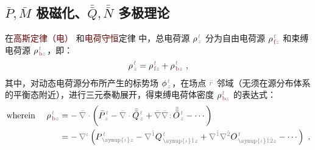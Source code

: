 \vspace*{-5.5em}

\subsection{$\bar{P},\bar{M}$ 极磁化、$\bar{\bar{Q}},\bar{\bar{N}}$ 多极理论}\label{ssec:PMQN}

在\textcolor{Maroon}{高斯定律（电）}  和\textcolor{Maroon}{电荷守恒}定律  中，总电荷源 ${\rho}^{\;\!\mathcolor{gray}{t}}_{\;\!\mathcolor{gray}{z}}$ 分为自由电荷源 ${\rho}^{\;\!\mathcolor{gray}{t}}_{\;\!\textcolor{Maroon}{\text{f}}\mathcolor{gray}{z}}$ 和束缚电荷源 ${\rho}^{\;\!\mathcolor{gray}{t}}_{\;\!\textcolor{Maroon}{\text{b}}\mathcolor{gray}{z}}$\cite{langeMultipoleTheoryHehl2015,raabMultipoleTheoryElectromagnetism2004}，即：
\abovedisplayskip=5pt
\belowdisplayskip=5pt
\begin{align} \label{eq:p=f+b}
	{\rho}^{\;\!\mathcolor{gray}{t}}_{\;\!\mathcolor{gray}{z}} = {\rho}^{\;\!\mathcolor{gray}{t}}_{\;\!\textcolor{Maroon}{\text{f}}\mathcolor{gray}{z}} + {\rho}^{\;\!\mathcolor{gray}{t}}_{\;\!\textcolor{Maroon}{\text{b}}\mathcolor{gray}{z}}~,
\end{align}
其中，对动态电荷源分布所产生的标势场 $\phi^{\;\!\mathcolor{gray}{t}}_{\;\!\mathcolor{gray}{z}}$，在场点 $\mathcolor{gray}{\bar{r}}$ 邻域（无须在源分布体系的平衡态附近），进行三元泰勒展开，得束缚电荷体密度 ${\rho}^{\;\!\mathcolor{gray}{t}}_{\;\!\textcolor{Maroon}{\text{b}}\mathcolor{gray}{z}}$ 的表达式\cite{raabMultipoleTheoryElectromagnetism2004,delangeTranslationalInvariancePost2012,chen-zhuChenZhuxieUndergraduate_courses2024}：
\begin{subequations}
	\abovedisplayskip=-10pt
\begin{align}
	\text{wherein}~~~~ {\rho}^{\;\!\mathcolor{gray}{t}}_{\;\!\textcolor{Maroon}{\text{b}}\mathcolor{gray}{z}} &= -\hspace{0.2em} \mathcolor{gray}{\bar{\nabla} \cdot} \left( \bar{P}^{\;\!\mathcolor{gray}{t}}_{\;\!\mathcolor{gray}{z}} - \mathcolor{gray}{\bar{\nabla} \cdot} \bar{\bar{Q}}^{\;\!\mathcolor{gray}{t}}_{\;\!\mathcolor{gray}{z}} + \mathcolor{gray}{\bar{\nabla}} \mathcolor{gray}{\bar{\nabla} \colon}\! \bar{\bar{\bar{O}}}^{\;\!\mathcolor{gray}{t}}_{\;\!\mathcolor{gray}{z}} - \cdots \right) \label{eq:P-b} \\
	&= -\hspace{0.2em} \mathcolor{gray}{\nabla^\iota} \left( P^{\;\!\mathcolor{gray}{t}}_{\;\! \mathcolor{gray}{\symup{\iota}} \mathcolor{gray}{z}} - \mathcolor{gray}{\nabla^{\hat{1}}} Q^{\;\!\mathcolor{gray}{t}}_{\;\! \mathcolor{gray}{\symup{\iota} \hat{1}} \mathcolor{gray}{z}} + \mathcolor{gray}{\nabla^{\hat{1}}} \mathcolor{gray}{\nabla^{\hat{2}}} O^{\;\!\mathcolor{gray}{t}}_{\;\! \mathcolor{gray}{\symup{\iota} \hat{1} \hat{2}} \mathcolor{gray}{z}} - \cdots \right)~. \label{eq:p-b}
\end{align}
\end{subequations}

